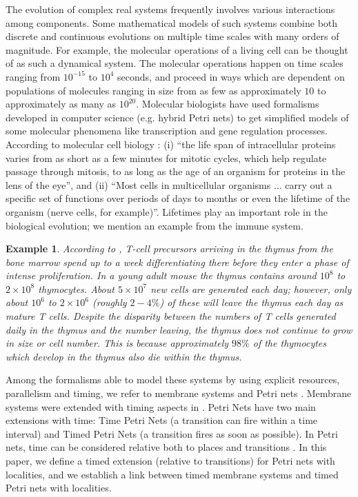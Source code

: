 \documentclass{eptcs}
\newtheorem{example}{Example}
\begin{document}
The evolution of complex real systems frequently involves various
interactions among components. Some mathematical models of such systems
combine both discrete and continuous evolutions on multiple time scales
with many orders of magnitude. For example, the molecular operations of a
living cell can be thought of as such a dynamical system. The molecular
operations happen on time scales ranging from $10^{-15}$ to $10^4$ seconds,
and proceed in ways which are dependent on populations of molecules ranging
in size from as few as approximately $10$ to approximately as many as
$10^{20}$. Molecular biologists have used formalisms developed in computer
science (e.g. hybrid Petri nets) to get simplified models of some molecular
phenomena like transcription and gene regulation processes. According to
molecular cell biology \cite{Lodish08}:
(i) ``the life span of intracellular proteins varies from as
short as a few minutes for mitotic cycles, which help regulate
passage through mitosis, to as long as the age of an organism for
proteins in the lens of the eye'', and
(ii) ``Most cells in multicellular organisms $\dots$ carry
out a specific set of functions over periods of days to months or
even the lifetime of the organism (nerve cells, for example)''.
Lifetimes play an important role in the
biological evolution; we mention an example from the immune system.
\begin{example}
According to \cite{Lodish08}, T-cell precursors arriving in the thymus from
the bone marrow spend up to a week differentiating there before they enter
a phase of intense proliferation. In a young adult mouse the thymus
contains around $10^8$ to $2 \times 10^8$ thymocytes. About $5 \times 10^7$
new cells are generated each day; however, only about $10^6$ to $2 \times
10^6$ (roughly $2-4\%$) of these will leave the thymus each day as mature T
cells. Despite the disparity between the numbers of T cells generated daily
in the thymus and the number leaving, the thymus does not continue to grow
in size or cell number. This is because approximately $98\%$ of the
thymocytes which develop in the thymus also die within the thymus.
\end{example}

Among the formalisms able to model these systems by using explicit
resources, parallelism and timing, we refer to membrane systems
\cite{Paun02} and Petri nets \cite{Jensen92,Peterson81}. Membrane
systems were extended with timing aspects in
\cite{Cavaliere05,Cavaliere10}. Petri Nets have two main extensions
with time: Time Petri Nets \cite{Merlin74} (a transition can fire
within a time interval) and Timed Petri Nets \cite{Ramchandani74} (a
transition fires as soon as possible). In Petri nets, time
can be considered relative both to places and transitions
\cite{Pezze99,Sifakis80}. In this paper, we define a timed extension
(relative to transitions) for Petri nets with localities, and we
establish a link between timed membrane systems and timed Petri nets
with localities.
\end{document}
